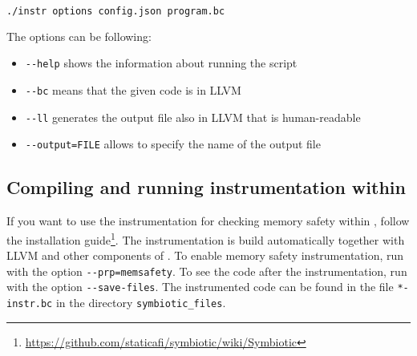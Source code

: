 \begin{lstlisting}[language=bash]
./instr options config.json program.bc
\end{lstlisting}

\newpage
\noindent The options can be following:
\begin{itemize}
  \item \texttt{-{}-help} shows the information about running the script
  \item \texttt{-{}-bc} means that the given code is in LLVM
  \item \texttt{-{}-ll} generates the output file also in LLVM that is human-readable
  \item \texttt{-{}-output=FILE} allows to specify the name of the output file
\end{itemize}

\subsection{Compiling and running instrumentation within \symbiotic}

If you want to use the instrumentation for checking memory safety within
\symbiotic, follow the \symbiotic installation
guide\footnote{\url{https://github.com/staticafi/symbiotic/wiki/Symbiotic}}.
The instrumentation is build automatically together with LLVM and other
components of \symbiotic. To enable memory safety instrumentation, run
\symbiotic with the option \texttt{-{}-prp=memsafety}. To see the code after
the instrumentation, run \symbiotic with the option \texttt{-{}-save-files}.
The instrumented code can be found in the file \texttt{*-instr.bc}
in the directory \texttt{symbiotic\_files}.

